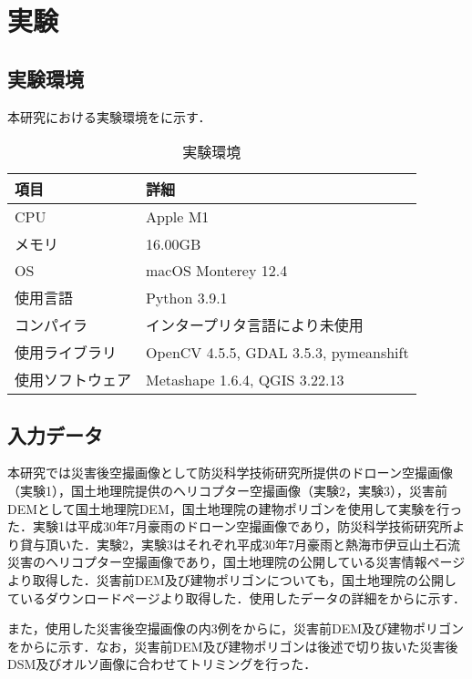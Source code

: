 \chapter{実験}
  \section{実験環境}
    本研究における実験環境をに示す．

    \begin{table}[t]
      \centering
      \caption{実験環境}
      \label{実験環境}
      \begin{tabular}{ll}
        \hline
        項目 & 詳細 \\
        \hline \hline
        CPU & Apple M1 \\
        メモリ & 16.00GB \\
        OS & macOS Monterey 12.4 \\
        使用言語 & Python 3.9.1 \\
        コンパイラ & インタープリタ言語により未使用 \\
        使用ライブラリ & OpenCV 4.5.5, GDAL 3.5.3, pymeanshift\cite{PyMeanShift} \\ 
        使用ソフトウェア & Metashape 1.6.4, QGIS 3.22.13 \\ \hline 
      \end{tabular}
    \end{table}


  \section{入力データ}
    \label{入力データ（実験）}
    本研究では災害後空撮画像として防災科学技術研究所提供のドローン空撮画像\cite{防災科研空撮画像}（実験1），国土地理院提供のヘリコプター空撮画像\cite{国土地理院空撮画像1,国土地理院空撮画像2}（実験2，実験3），災害前DEMとして国土地理院DEM，国土地理院の建物ポリゴンを使用して実験を行った．実験1は平成30年7月豪雨のドローン空撮画像であり，防災科学技術研究所より貸与頂いた．実験2，実験3はそれぞれ平成30年7月豪雨と熱海市伊豆山土石流災害のヘリコプター空撮画像であり，国土地理院の公開している災害情報ページより取得した．災害前DEM及び建物ポリゴンについても，国土地理院の公開しているダウンロードページより取得した．使用したデータの詳細をからに示す．

    また，使用した災害後空撮画像の内3例をからに，災害前DEM及び建物ポリゴンをからに示す．なお，災害前DEM及び建物ポリゴンは後述で切り抜いた災害後DSM及びオルソ画像に合わせてトリミングを行った．

